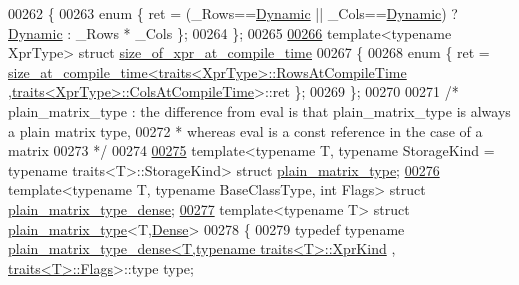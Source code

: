 \begin{DoxyCode}
{00262 \{
00263   \textcolor{keyword}{enum} \{ ret = (\_Rows==\hyperlink{namespace_eigen_ad81fa7195215a0ce30017dfac309f0b2}{Dynamic} || \_Cols==\hyperlink{namespace_eigen_ad81fa7195215a0ce30017dfac309f0b2}{Dynamic}) ? \hyperlink{namespace_eigen_ad81fa7195215a0ce30017dfac309f0b2}{Dynamic} : \_Rows * \_Cols \};
00264 \};
00265 
\hyperlink{struct_eigen_1_1internal_1_1size__of__xpr__at__compile__time}{00266} \textcolor{keyword}{template}<\textcolor{keyword}{typename} XprType> \textcolor{keyword}{struct }\hyperlink{struct_eigen_1_1internal_1_1size__of__xpr__at__compile__time}{size\_of\_xpr\_at\_compile\_time}
00267 \{
00268   \textcolor{keyword}{enum} \{ ret = \hyperlink{struct_eigen_1_1internal_1_1size__at__compile__time}{size\_at\_compile\_time<traits<XprType>::RowsAtCompileTime}
      ,\hyperlink{struct_eigen_1_1internal_1_1traits}{traits<XprType>::ColsAtCompileTime}>::ret \};
00269 \};
00270 
00271 \textcolor{comment}{/* plain\_matrix\_type : the difference from eval is that plain\_matrix\_type is always a plain matrix type,}
00272 \textcolor{comment}{ * whereas eval is a const reference in the case of a matrix}
00273 \textcolor{comment}{ */}
00274 
\hyperlink{struct_eigen_1_1internal_1_1plain__matrix__type}{00275} template<typename T, typename StorageKind = typename traits<T>::StorageKind> \textcolor{keyword}{struct }
      \hyperlink{struct_eigen_1_1internal_1_1plain__matrix__type}{plain\_matrix\_type};
\hyperlink{struct_eigen_1_1internal_1_1plain__matrix__type__dense}{00276} \textcolor{keyword}{template}<\textcolor{keyword}{typename} T, \textcolor{keyword}{typename} BaseClassType, \textcolor{keywordtype}{int} Flags> \textcolor{keyword}{struct }
      \hyperlink{struct_eigen_1_1internal_1_1plain__matrix__type__dense}{plain\_matrix\_type\_dense};
\hyperlink{struct_eigen_1_1internal_1_1plain__matrix__type_3_01_t_00_01_dense_01_4}{00277} \textcolor{keyword}{template}<\textcolor{keyword}{typename} T> \textcolor{keyword}{struct }\hyperlink{struct_eigen_1_1internal_1_1plain__matrix__type}{plain\_matrix\_type}<T,\hyperlink{struct_eigen_1_1_dense}{Dense}>
00278 \{
00279   \textcolor{keyword}{typedef} \textcolor{keyword}{typename} \hyperlink{struct_eigen_1_1internal_1_1plain__matrix__type__dense}{plain\_matrix\_type\_dense<T,typename traits<T>::XprKind}
      , \hyperlink{struct_eigen_1_1internal_1_1traits}{traits<T>::Flags}>::type type;
}
\end{DoxyCode}
